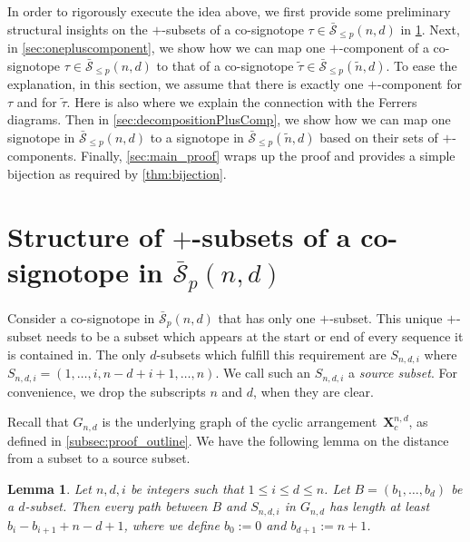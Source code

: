 \documentclass[a4paper,11pt]{amsart}
\newtheorem{lemma}[theorem]{Lemma}
\newcommand{\calS}{\mathcal{S}}
\newcommand{\tn}{\tilde{n}}
\newcommand{\defi}[1]{\textcolor{defblue}{\emph{#1}}}
\begin{document}
In order to rigorously execute the idea above, we first provide some preliminary structural insights on the $+$-subsets of a co-signotope $\tau \in \bar{\calS}_{\leq p}(n,d)$ in \cref{sec:plus_subsets}.
Next, in \cref{sec:onepluscomponent}, we show how we can map one $+$-component of a co-signotope $\tau \in \bar{\calS}_{\leq p}(n,d)$ to that of a co-signotope $\tilde{\tau} \in \bar{\calS}_{\leq p}(\tn,d)$.
To ease the explanation, in this section, we assume that there is exactly one $+$-component for $\tau$ and for $\tilde{\tau}$.
Here is also where we explain the connection with the Ferrers diagrams.
Then in \cref{sec:decompositionPlusComp}, we show how we can map one signotope in $\bar{\calS}_{\leq p}(n,d)$ to a signotope in $\bar{\calS}_{\leq p}(\tn,d)$ based on their sets of $+$-components. 
Finally, \cref{sec:main_proof} wraps up the proof and provides a simple bijection as required by \cref{thm:bijection}.

\section{Structure of $+$-subsets of a co-signotope in $\bar{\calS}_p(n,d)$}
\label{sec:plus_subsets}
Consider a co-signotope in $\bar{\calS}_p(n,d)$ that has only one $+$-subset.
This unique $+$-subset needs to be a subset which appears at the start or end of every sequence it is contained in. 
The only $d$-subsets which fulfill this requirement are $S_{n,d,i}$ where $S_{n,d,i} = (1, \ldots, i, n-d+i+1, \ldots, n)$.
We call such an $S_{n,d,i}$ a \defi{source subset}.
For convenience, we drop the subscripts $n$ and $d$, when they are clear.

Recall that $G_{n,d}$ is the underlying graph of the cyclic arrangement~$\mathbf{X}^{n,d}_c$, as defined in \cref{subsec:proof_outline}.
We have the following lemma on the distance from a subset to a source subset.

\begin{lemma}
\label{lem:dist_to_source}
	Let $n,d,i$ be integers such that $1 \leq i \leq d \leq n$.
	Let $B = (b_1, \dots, b_d)$ be a $d$-subset.
	Then every path between $B$ and $S_{n,d,i}$ in $G_{n,d}$ has length at least $b_i-b_{i+1}+n-d+1$, where we define $b_0 := 0$ and $b_{d+1} := n+1$.
\end{lemma}
\end{document}
